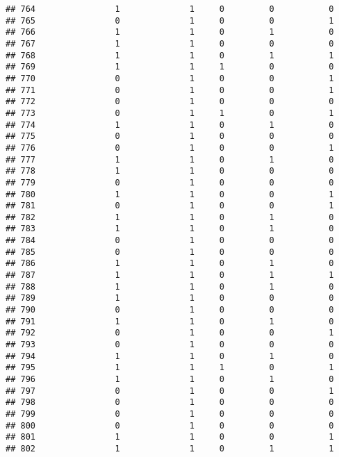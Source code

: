 \documentclass[]{article}
\begin{document}
\begin{verbatim}
## 764                1              1     0         0           0
## 765                0              1     0         0           1
## 766                1              1     0         1           0
## 767                1              1     0         0           0
## 768                1              1     0         1           1
## 769                1              1     1         0           0
## 770                0              1     0         0           1
## 771                0              1     0         0           1
## 772                0              1     0         0           0
## 773                0              1     1         0           1
## 774                1              1     0         1           0
## 775                0              1     0         0           0
## 776                0              1     0         0           1
## 777                1              1     0         1           0
## 778                1              1     0         0           0
## 779                0              1     0         0           0
## 780                1              1     0         0           1
## 781                0              1     0         0           1
## 782                1              1     0         1           0
## 783                1              1     0         1           0
## 784                0              1     0         0           0
## 785                0              1     0         0           0
## 786                1              1     0         1           0
## 787                1              1     0         1           1
## 788                1              1     0         1           0
## 789                1              1     0         0           0
## 790                0              1     0         0           0
## 791                1              1     0         1           0
## 792                0              1     0         0           1
## 793                0              1     0         0           0
## 794                1              1     0         1           0
## 795                1              1     1         0           1
## 796                1              1     0         1           0
## 797                0              1     0         0           1
## 798                0              1     0         0           0
## 799                0              1     0         0           0
## 800                0              1     0         0           0
## 801                1              1     0         0           1
## 802                1              1     0         1           1

\end{verbatim}
\end{document}
